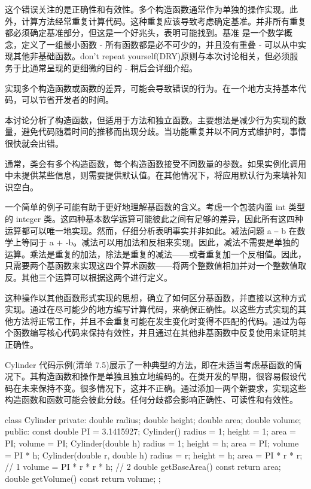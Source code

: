 这个错误关注的是正确性和有效性。多个构造函数通常作为单独的操作实现。此外，计算方法经常重复计算代码。这种重复应该导致考虑确定基准。并非所有重复都必须确定基准部分，但这是一个好兆头，表明可能找到。基准 是一个数学概念，定义了一组最小函数 - 所有函数都是必不可少的，并且没有重叠 - 可以从中实现其他非基础函数。don’t repeat yourself(DRY)原则与本次讨论相关，但必须服务于比通常呈现的更细微的目的 - 稍后会详细介绍。

实现多个构造函数或函数的差异，可能会导致错误的行为。在一个地方支持基本代码，可以节省开发者的时间。

本讨论分析了构造函数，但适用于方法和独立函数。主要想法是减少行为实现的数量，避免代码随着时间的推移而出现分歧。当功能重复并以不同方式维护时，事情很快就会出错。

通常，类会有多个构造函数，每个构造函数接受不同数量的参数。如果实例化调用中未提供某些信息，则需要提供默认值。在其他情况下，将应用默认行为来填补知识空白。


一个简单的例子可能有助于更好地理解基函数的含义。考虑一个包装内置 int 类型的 integer 类。这四种基本数学运算可能彼此之间有足够的差异，因此所有这四种运算都可以唯一地实现。然而，仔细分析表明事实并非如此。减法问题 a \verb|–| b 在数学上等同于 a + -b。减法可以用加法和反相来实现。因此，减法不需要是单独的运算。乘法是重复的加法，除法是重复的减法——或者重复加一个反相值。因此，只需要两个基函数来实现这四个算术函数——将两个整数值相加并对一个整数值取反。其他三个运算可以根据这两个进行定义。

这种操作以其他函数形式实现的思想，确立了如何区分基函数，并直接以这种方式实现。通过在尽可能少的地方编写计算代码，来确保正确性。以这些方式实现的其他方法将正常工作，并且不会重复可能在发生变化时变得不匹配的代码。通过为每个函数编写核心代码来保持有效性，并且通过在其他非基函数中反复使用来证明其正确性。

Cylinder 代码示例(清单 7.5)展示了一种典型的方法，即在未适当考虑基函数的情况下。其构造函数和操作是单独且独立地编码的。在类开发的早期，很容易假设代码在未来保持不变。很多情况下，这并不正确。通过添加一两个新要求，实现这些构造函数和函数可能会彼此分歧。任何分歧都会影响正确性、可读性和有效性。


\begin{cpp}
class Cylinder {
private:
  double radius;
  double height;
  double area;
  double volume;
public:
  const double PI = 3.1415927;
  Cylinder() {
    radius = 1;
    height = 1;
    area = PI;
    volume = PI;
  }
  Cylinder(double h) {
    radius = 1;
    height = h;
    area = PI;
    volume = PI * h;
  }
  Cylinder(double r, double h) {
    radius = r;
    height = h;
    area = PI * r * r; // 1
    volume = PI * r * r * h; // 2
  }
  double getBaseArea() const { return area; }
  double getVolume() const { return volume; }
};
\end{cpp}

